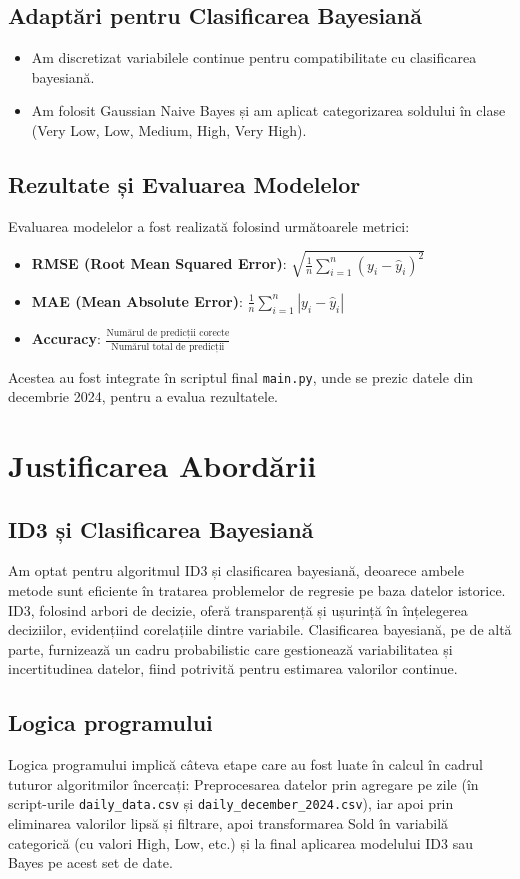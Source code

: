 \documentclass[a4paper,12pt]{article}
\begin{document}
\subsection*{Adaptări pentru Clasificarea Bayesiană}
\begin{itemize}
    \item Am discretizat variabilele continue pentru compatibilitate cu clasificarea bayesiană.
    \item Am folosit Gaussian Naive Bayes și am aplicat categorizarea soldului în clase (Very Low, Low, Medium, High, Very High).
\end{itemize}

\subsection{Rezultate și Evaluarea Modelelor}
Evaluarea modelelor a fost realizată folosind următoarele metrici:
\begin{itemize}
    \item \textbf{RMSE (Root Mean Squared Error)}: $\sqrt{\frac{1}{n}\sum_{i=1}^{n}(y_i - \hat{y}_i)^2}$
    \item \textbf{MAE (Mean Absolute Error)}: $\frac{1}{n}\sum_{i=1}^{n}|y_i - \hat{y}_i|$
    \item \textbf{Accuracy}: $\frac{\text{Numărul de predicții corecte}}{\text{Numărul total de predicții}}$
\end{itemize}
Acestea au fost integrate în scriptul final \texttt{main.py}, unde se prezic datele din decembrie 2024, pentru a evalua rezultatele.

\section{Justificarea Abordării}
\subsection{ID3 și Clasificarea Bayesiană}
Am optat pentru algoritmul ID3 și clasificarea bayesiană, deoarece ambele metode sunt eficiente în tratarea problemelor de regresie pe baza datelor istorice. ID3, folosind arbori de decizie, oferă transparență și ușurință în înțelegerea deciziilor, evidențiind corelațiile dintre variabile. Clasificarea bayesiană, pe de altă parte, furnizează un cadru probabilistic care gestionează variabilitatea și incertitudinea datelor, fiind potrivită pentru estimarea valorilor continue.

\subsection{Logica programului}
Logica programului implică câteva etape care au fost luate în calcul în cadrul tuturor algoritmilor încercați: Preprocesarea datelor prin agregare pe zile (în script-urile \texttt{daily\_data.csv} și \texttt{daily\_december\_2024.csv}), iar apoi prin eliminarea valorilor lipsă și filtrare, apoi transformarea Sold în variabilă categorică (cu valori High, Low, etc.) și la final aplicarea modelului ID3 sau Bayes pe acest set de date. \\
\end{document}
